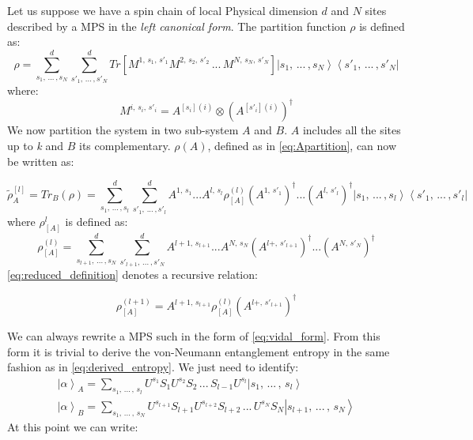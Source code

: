 \documentclass[12pt, a4paper, twoside, titlepage]{article}
\newcommand{\ket}[1]{\ensuremath{\left|#1\right\rangle}}
\newcommand{\bra}[1]{\ensuremath{\left\langle#1\right|}}
\begin{document}
Let us suppose we have a spin chain of local Physical dimension $d$ and $N$ sites described by a MPS in the  \textit{left canonical form}. The partition function $\rho$ is defined as:
\begin{equation}
\rho = \sum^d_{s_1, \, ... \, , s_N }\sum^d_{s'_1, \, ... \, , s'_N }Tr\left[ M^{1,\, s_1, \, s'_1} M^{2, \, s_2,\, s'_2} \, ... \, M^{N, \, s_N,\, s'_N} \right]\ket{s_1, \, ... \, , s_N} \bra{s'_1, \, ... \, , s'_N}
\end{equation}
where:
\begin{equation}
M^{i,\, s_i, \, s'_i} = A^{[s_i](i)} \otimes \left(A^{[s'_i](i)} \right)^\dag
\end{equation}
We now partition the system in two sub-system $A$ and $B$. $A$ includes all the sites up to \textit{k} and $B$ its complementary.
$\rho(A)$, defined as in \cref{eq:Apartition}, can now be written as:

\begin{equation}
\tilde{\rho}_A^{[l]}=Tr_B(\rho)= \sum^d_{s_1, \, ... \, , s_l }\sum^d_{s'_1, \, ... \, , s'_l }  A^{1, \, s_1} ... A^{l, \, s_l} \rho^{(l)}_{[A]}  \left( A^{1, \, s'_1} \right)^\dag ... \left(A^{l, \, s'_l}\right)^\dag \ket{s_1, \, ... \, , s_l} \bra{s'_1, \, ... \, , s'_l}
\end{equation}
where $\rho^l_{[A]}$ is defined as:
\begin{equation}\label{eq:reduced_definition}
\rho^{(l)}_{[A]}= \sum^d_{s_{l+1}, \, ... \, , s_N }\sum^d_{s'_{l+1}, \, ... \, , s'_N }  A^{l+1, \, s_{l+1}} ... A^{N, \, s_N}  \left( A^{l+, \, s'_{l+1}} \right)^\dag ... \left(A^{N, \, s'_N}\right)^\dag
\end{equation}
\cref{eq:reduced_definition} denotes a recursive relation:

\begin{equation}
\rho^{(l+1)}_{[A]} = A^{l+1, \, s_{l+1}} \rho^{(l)}_{[A]} \left( A^{l+, \, s'_{l+1}} \right)^\dag
\end{equation}


We can always rewrite a MPS such in the form of \cref{eq:vidal_form}. From this form it is trivial to derive the von-Neumann entanglement entropy in the same fashion as in \cref{eq:derived_entropy}. We just need to identify:
\begin{align}
\ket {\alpha}_A = \sum_{s_1, \, ... \, , \, s_l} U^{s_1} S_{1}U^{s_2} S_{2} \, ... \,S_{l-1} U^{s_l}  \ket{s_1, \, ... \, , \, s_l}\\
\ket {\alpha}_B = \sum_{s_1, \, ... \, , \, s_N} U^{s_{l+1}} S_{{l+1}}U^{s_{l+2}} S_{l+2} \, ... \, U^{s_N} S_{N} \ket{s_{l+1}, \, ... \, , \, s_N}
\end{align}
At this point we can write:
\end{document}
